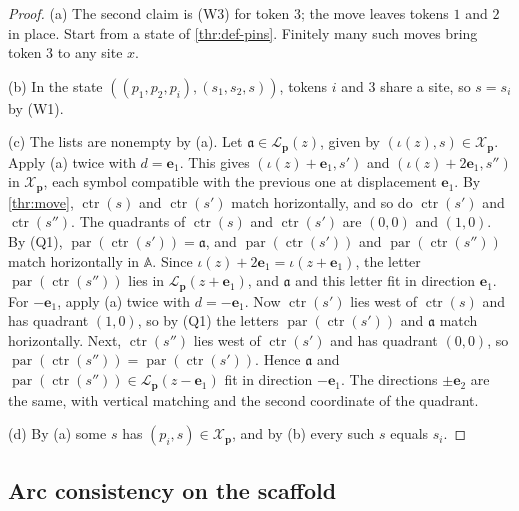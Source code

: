 \begin{proof}
(a) The second claim is (W3) for token $3$; the move leaves tokens $1$ and $2$ in place. Start from a state of \cref{thr:def-pins}. Finitely many such moves bring token $3$ to any site $x$.

(b) In the state $((p_1,p_2,p_i),(s_1,s_2,s))$, tokens $i$ and $3$ share a site, so $s=s_i$ by (W1).

(c) The lists are nonempty by (a). Let $\mathfrak a\in\mathcal L_{\mathbf p}(z)$, given by $(\iota(z),s)\in\mathcal X_{\mathbf p}$. Apply (a) twice with $d=\mathbf e_1$. This gives $(\iota(z)+\mathbf e_1,s')$ and $(\iota(z)+2\mathbf e_1,s'')$ in $\mathcal X_{\mathbf p}$, each symbol compatible with the previous one at displacement $\mathbf e_1$. By \cref{thr:move}, $\operatorname{ctr}(s)$ and $\operatorname{ctr}(s')$ match horizontally, and so do $\operatorname{ctr}(s')$ and $\operatorname{ctr}(s'')$. The quadrants of $\operatorname{ctr}(s)$ and $\operatorname{ctr}(s')$ are $(0,0)$ and $(1,0)$. By (Q1), $\operatorname{par}(\operatorname{ctr}(s'))=\mathfrak a$, and $\operatorname{par}(\operatorname{ctr}(s'))$ and $\operatorname{par}(\operatorname{ctr}(s''))$ match horizontally in $\mathbb A$. Since $\iota(z)+2\mathbf e_1=\iota(z+\mathbf e_1)$, the letter $\operatorname{par}(\operatorname{ctr}(s''))$ lies in $\mathcal L_{\mathbf p}(z+\mathbf e_1)$, and $\mathfrak a$ and this letter fit in direction $\mathbf e_1$. For $-\mathbf e_1$, apply (a) twice with $d=-\mathbf e_1$. Now $\operatorname{ctr}(s')$ lies west of $\operatorname{ctr}(s)$ and has quadrant $(1,0)$, so by (Q1) the letters $\operatorname{par}(\operatorname{ctr}(s'))$ and $\mathfrak a$ match horizontally. Next, $\operatorname{ctr}(s'')$ lies west of $\operatorname{ctr}(s')$ and has quadrant $(0,0)$, so $\operatorname{par}(\operatorname{ctr}(s''))=\operatorname{par}(\operatorname{ctr}(s'))$. Hence $\mathfrak a$ and $\operatorname{par}(\operatorname{ctr}(s''))\in\mathcal L_{\mathbf p}(z-\mathbf e_1)$ fit in direction $-\mathbf e_1$. The directions $\pm\mathbf e_2$ are the same, with vertical matching and the second coordinate of the quadrant.

(d) By (a) some $s$ has $(p_i,s)\in\mathcal X_{\mathbf p}$, and by (b) every such $s$ equals $s_i$.
\end{proof}

\subsection{Arc consistency on the scaffold}\label{thr:sec-ac}

